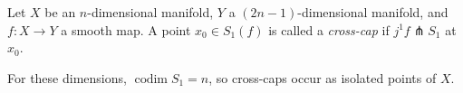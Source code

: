 Let $X$ be an $n$-dimensional manifold, $Y$ a $(2n-1)$-dimensional manifold, and $f: X \to Y$ a smooth map. A point $x_0 \in S_1(f)$ is called a \textit{cross-cap} if $j^1 f \pitchfork S_1$ at $x_0$.

For these dimensions, $\operatorname{codim} S_1 = n$, so cross-caps occur as isolated points of $X$.

